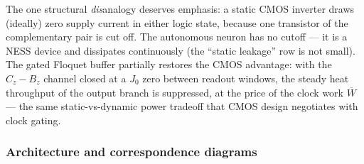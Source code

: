 \documentclass[11pt,a4paper]{article}
\theoremstyle{definition}
\theoremstyle{remark}
\begin{document}
The one structural \emph{dis}analogy deserves emphasis: a static CMOS
inverter draws (ideally) zero supply current in either logic state,
because one transistor of the complementary pair is cut off. The
autonomous neuron has no cutoff --- it is a NESS device and dissipates
continuously (the ``static leakage'' row is not small). The gated
Floquet buffer partially restores the CMOS advantage: with the
$C_z\!-\!B_z$ channel closed at a $J_0$ zero between readout windows,
the steady heat throughput of the output branch is suppressed, at the
price of the clock work $\overline W$ --- the same static-vs-dynamic
power tradeoff that CMOS design negotiates with clock gating.
 
\subsubsection{Architecture and correspondence diagrams}
\end{document}
